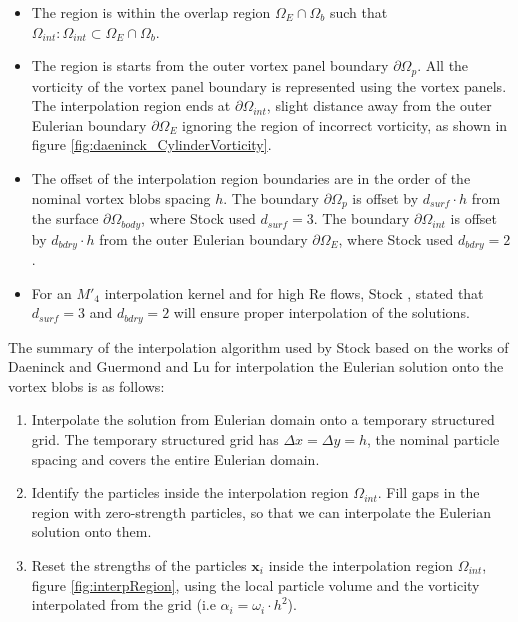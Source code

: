 	\begin{itemize}
	\item The region is within the overlap region $\Omega_E \cap \Omega_b$ such that $\Omega_{int}: \Omega_{int} \subset \Omega_E \cap \Omega_b$.
	\item The region is starts from the outer vortex panel boundary $\partial \Omega_p$. All the vorticity of the vortex panel boundary is represented using the vortex panels. The interpolation region ends at $\partial \Omega_{int}$, slight distance away from the outer Eulerian boundary $\partial \Omega_E$ ignoring the region of incorrect vorticity, as shown in figure \ref{fig:daeninck_CylinderVorticity}.
	\item The offset of the interpolation region boundaries are in the order of the nominal vortex blobs spacing $h$. The boundary $\partial \Omega_{p}$ is offset by $d_{surf}\cdot h$ from the surface $\partial \Omega_{body}$, where Stock used $d_{surf}=3$. The boundary $\partial \Omega_{int}$ is offset by $d_{bdry}\cdot h$ from the outer Eulerian boundary $\partial \Omega_{E}$, where Stock used $d_{bdry}=2$. 
	\item For an $M'_4$ interpolation kernel and for high Re flows, Stock \cite{Stock2010a}, stated that $d_{surf}=3$ and $d_{bdry}=2$ will ensure proper interpolation of the solutions.
	\end{itemize}

The summary of the interpolation algorithm used by Stock \cite{Stock2010a} based on the works of Daeninck \cite{Daeninck2006} and Guermond and Lu \cite{Guermond2000a} for interpolation the Eulerian solution onto the vortex blobs is as follows:
\begin{enumerate}
\item Interpolate the solution from Eulerian domain onto a temporary structured grid. The temporary structured grid has $\Delta x = \Delta y = h$, the nominal particle spacing and covers the entire Eulerian domain. %
\item Identify the particles inside the interpolation region $\Omega_{int}$. Fill gaps in the region with zero-strength particles, so that we can interpolate the Eulerian solution onto them. 
\item Reset the strengths of the particles $\mathbf{x}_i$ inside the interpolation region $\Omega_{int}$, figure \ref{fig:interpRegion}, using the local particle volume and the vorticity interpolated from the grid (i.e $\alpha_i = \omega_i\cdot{h^2}$).
\end{enumerate}


